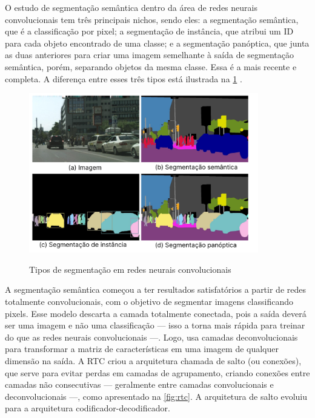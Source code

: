 \label{sec:segmentacao}

O estudo de segmentação semântica dentro da área de redes neurais convolucionais tem três principais nichos, sendo eles: a segmentação semântica, que é a classificação por pixel; a segmentação de instância, que atribui um ID para cada objeto encontrado de uma classe; e a segmentação panóptica, que junta as duas anteriores para criar uma imagem semelhante à saída de segmentação semântica, porém, separando objetos da mesma classe. Essa é a mais recente e completa. A diferença entre esses três tipos está ilustrada na \cref{fig:segentacoes} \space\cite{dp_semantic_segmantation, lapix}.

\begin{figure}[ht]
    \caption{Tipos de segmentação em redes neurais convolucionais}
    \centering %
    \includegraphics[width=10cm]{figures/segmantations.png} %
    \label{fig:segentacoes}
\end{figure}


A segmentação semântica começou a ter resultados satisfatórios a partir de redes totalmente convolucionais, com o objetivo de segmentar imagens classificando pixels. Esse modelo descarta a camada totalmente conectada, pois a saída deverá ser uma imagem e não uma classificação — isso a torna mais rápida para treinar do que as redes neurais convolucionais —. Logo, usa camadas deconvolucionais para transformar a matriz de características em uma imagem de qualquer dimensão na saída. A RTC criou a arquitetura chamada de salto (ou conexões), que serve para evitar perdas em camadas de agrupamento, criando conexões entre camadas não consecutivas — geralmente entre camadas convolucionais e deconvolucionais —, como apresentado na \cref{fig:rtc}. A arquitetura de salto evoluiu para a arquitetura codificador-decodificador.

